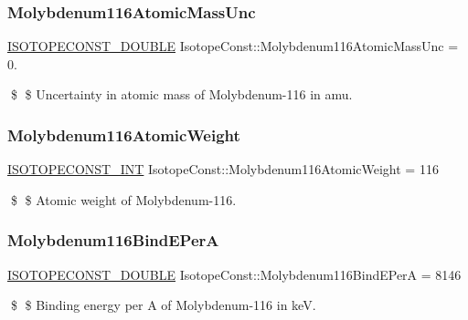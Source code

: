 \subsubsection{\texorpdfstring{Molybdenum116\+Atomic\+Mass\+Unc}{Molybdenum116AtomicMassUnc}}
{\footnotesize\ttfamily \mbox{\hyperlink{group___isotope_const-_macros_ga8f45a7272ce02c0b4c65c44636ed719a}{I\+S\+O\+T\+O\+P\+E\+C\+O\+N\+S\+T\+\_\+\+D\+O\+U\+B\+LE}} Isotope\+Const\+::\+Molybdenum116\+Atomic\+Mass\+Unc = 0.}

\$ \$ Uncertainty in atomic mass of Molybdenum-\/116 in amu. \mbox{\label{group___isotope_const-_molybdenum-_mo116_gaa79f6f5652e14e84c4d6b27f9eda44ac}} 
\subsubsection{\texorpdfstring{Molybdenum116\+Atomic\+Weight}{Molybdenum116AtomicWeight}}
{\footnotesize\ttfamily \mbox{\hyperlink{group___isotope_const-_macros_ga5f18360b3e99483a35c32d789e62621c}{I\+S\+O\+T\+O\+P\+E\+C\+O\+N\+S\+T\+\_\+\+I\+NT}} Isotope\+Const\+::\+Molybdenum116\+Atomic\+Weight = 116}

\$ \$ Atomic weight of Molybdenum-\/116. \mbox{\label{group___isotope_const-_molybdenum-_mo116_ga6737e62d4c4eeffe791c37023708555a}} 
\subsubsection{\texorpdfstring{Molybdenum116\+Bind\+E\+PerA}{Molybdenum116BindEPerA}}
{\footnotesize\ttfamily \mbox{\hyperlink{group___isotope_const-_macros_ga8f45a7272ce02c0b4c65c44636ed719a}{I\+S\+O\+T\+O\+P\+E\+C\+O\+N\+S\+T\+\_\+\+D\+O\+U\+B\+LE}} Isotope\+Const\+::\+Molybdenum116\+Bind\+E\+PerA = 8146}

\$ \$ Binding energy per A of Molybdenum-\/116 in keV. \mbox{\label{group___isotope_const-_molybdenum-_mo116_gaed21d0196e9e9092ab68f22711df3eb9}} 
